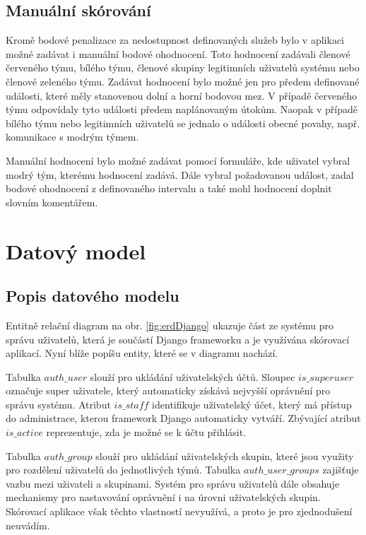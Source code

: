 \documentclass[
  digital, %
  twoside, %
  table,   %
  nolof,     %
  nolot,     %
]{fithesis3}
\begin{document}
\subsection{Manuální skórování}
Kromě bodové penalizace za nedostupnost definovaných služeb bylo v aplikaci možné zadávat i manuální bodové ohodnocení. Toto hodnocení zadávali členové červeného týmu, bílého týmu, členové skupiny legitimních uživatelů systému nebo členové zeleného týmu. Zadávat hodnocení bylo možné jen pro předem definované události, které měly stanovenou dolní a horní bodovou mez. V případě červeného týmu odpovídaly tyto události předem naplánovaným útokům. Naopak v případě bílého týmu nebo legitimních uživatelů se jednalo o události obecné povahy, např. komunikace s modrým týmem.

Manuální hodnocení bylo možné zadávat pomocí formuláře, kde uživatel vybral modrý tým, kterému hodnocení zadává. Dále vybral požadovanou událost, zadal bodové ohodnocení z definovaného intervalu a také mohl hodnocení doplnit slovním komentářem.

\section{Datový model}
\subsection{Popis datového modelu}

Entitně relační diagram na obr. \ref{fig:erdDjango} ukazuje část ze systému pro správu uživatelů, která je součástí Django frameworku a je využívána skórovací aplikací. Nyní blíže popíšu entity, které se v diagramu nachází.

Tabulka $auth\_user$ slouží pro ukládání uživatelských účtů. Sloupec $is\_superuser$ označuje super uživatele, který automaticky získává nejvyšší oprávnění pro správu systému. Atribut $is\_staff$ identifikuje uživatelský účet, který má přístup do administrace, kterou framework Django automaticky vytváří. Zbývající atribut $is\_active$ reprezentuje, zda je možné se k účtu přihlásit.

Tabulka $auth\_group$ slouží pro ukládání uživatelských skupin, které jsou využity pro rozdělení uživatelů do jednotlivých týmů. Tabulka $auth\_user\_groups$ zajišťuje vazbu mezi uživateli a skupinami. Systém pro správu uživatelů dále obsahuje mechanismy pro nastavování oprávnění i na úrovni uživatelských skupin. Skórovací aplikace však těchto vlastností nevyužívá, a proto je pro zjednodušení neuvádím.
\end{document}
